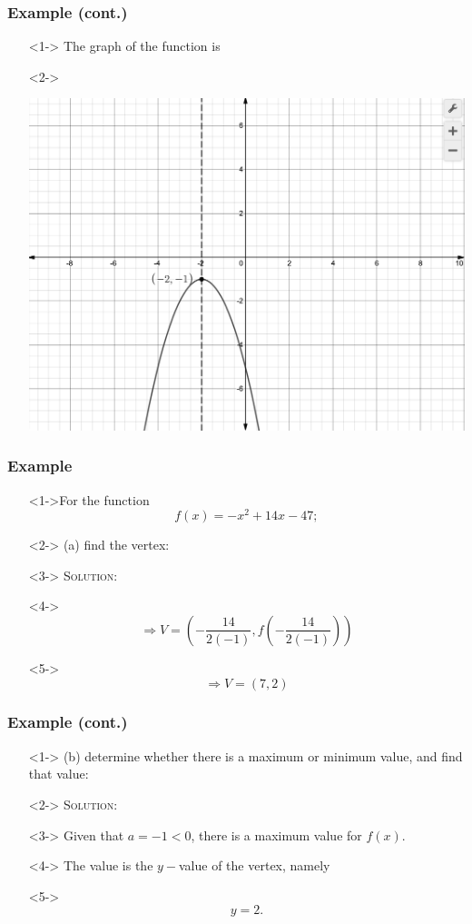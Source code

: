 \documentclass[handout]{beamer}
\begin{document}
\begin{frame}
	\frametitle{Example (cont.)}
	\begin{enumerate}
		\item[]<1-> The graph of the function is
		\item[]<2->\begin{center}
				\includegraphics[scale=0.25]{3_3_7.png}
			\end{center}
	\end{enumerate}
\end{frame}

\begin{frame}
	\frametitle{Example}
	\begin{enumerate}
		\item[]<1->For the function
		\[
			f(x)=-x^{2}+14x-47;
		\]
		\item[]<2-> (a) find the vertex:
		\item[]<3-> \textsc{Solution:}
		\item[]<4->\[ \Rightarrow V=\left(-\frac{14}{2(-1)}, f \left( -\frac{14}{2(-1)} \right)  \right) \]
		\item[]<5-> \[ \Rightarrow V= \left( 7, 2 \right) \]
	\end{enumerate}
\end{frame}

\begin{frame}
	\frametitle{Example (cont.)}
	\begin{enumerate}
		\item[]<1-> (b) determine whether there is a maximum or minimum value, and find that value:
		\item[]<2-> \textsc{Solution:}
		\item[]<3-> Given that $a=-1<0$, there is a maximum value for $f(x)$.
		\item[]<4-> The value is the $y-$value of the vertex, namely
		\item[]<5-> \[ y=2. \]
	\end{enumerate}
\end{frame}
\end{document}
